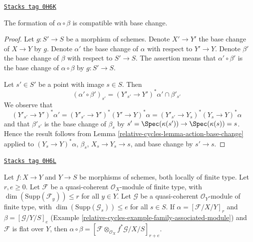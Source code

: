 \begin{lemma}
\label{relative-cycles-lemma-construction-base-change}
\href{https://stacks.math.columbia.edu/tag/0H6K}{\texttt{Stacks tag 0H6K}}

The formation of $\alpha \circ \beta$ is compatible with base change.
\end{lemma}

\begin{proof}
Let $g : S' \to S$ be a morphism of schemes.
Denote $X' \to Y'$ the base change of $X \to Y$ by $g$. Denote
$\alpha'$ the base change of $\alpha$ with respect to $Y' \to Y$.
Denote $\beta'$ the base change of $\beta$ with respect to $S' \to S$.
The assertion means that $\alpha' \circ \beta'$ is the base change
of $\alpha \circ \beta$ by $g : S' \to S$.

\medskip\noindent
Let $s' \in S'$ be a point with image $s \in S$. Then
$$
(\alpha' \circ \beta')_{s'} = (Y'_{s'} \to Y')^*\alpha' \cap \beta'_{s'}
$$
We observe that
$$
(Y'_{s'} \to Y')^*\alpha' =
(Y'_{s'} \to Y')^*(Y' \to Y)^*\alpha =
(Y'_{s'} \to Y_s)^*(Y_s \to Y)^*\alpha
$$
and that $\beta'_{s'}$ is the base change of $\beta_s$ by
$s' = \Spec(\kappa(s')) \to \Spec(\kappa(s)) = s$.
Hence the result follows from Lemma \ref{relative-cycles-lemma-action-base-change}
applied to $(Y_s \to Y)^*\alpha$, $\beta_s$,
$X_s \to Y_s \to s$, and base change by $s' \to s$.
\end{proof}

\begin{lemma}
\label{relative-cycles-lemma-construction-coherent}
\href{https://stacks.math.columbia.edu/tag/0H6L}{\texttt{Stacks tag 0H6L}}

Let $f : X \to Y$ and $Y \to S$ be morphisms of schemes, both locally of
finite type. Let $r, e \geq 0$. Let $\mathcal{F}$ be a quasi-coherent
$\mathcal{O}_X$-module of finite type, with
$\dim(\text{Supp}(\mathcal{F}_y)) \leq r$ for all $y \in Y$.
Let $\mathcal{G}$  be a quasi-coherent $\mathcal{O}_Y$-module of finite
type, with $\dim(\text{Supp}(\mathcal{G}_s)) \leq e$ for all $s \in S$.
If $\alpha = [\mathcal{F}/X/Y]_r$ and $\beta = [\mathcal{G}/Y/S]_e$
(Example \ref{relative-cycles-example-family-associated-module}) and $\mathcal{F}$
is flat over $Y$, then $\alpha \circ \beta =
[\mathcal{F} \otimes_{\mathcal{O}_X} f^*\mathcal{G}/X/S]_{r + e}$.
\end{lemma}

